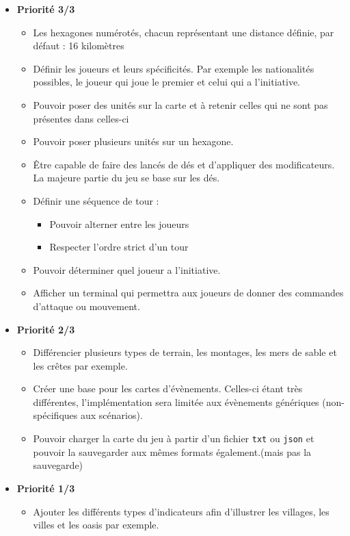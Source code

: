 \begin{itemize}
    \item \textbf{Priorité 3/3}
    \begin{itemize}
        \item Les hexagones numérotés, chacun représentant une distance définie, par défaut : 16 kilomètres \cmark
        \item Définir les joueurs et leurs spécificités. Par exemple les nationalités possibles, le joueur 
qui joue le premier et celui qui a l’initiative.\cmark
        \item Pouvoir poser des unités sur la carte et à retenir celles qui ne sont pas présentes dans
celles-ci \cmark
        \item Pouvoir poser plusieurs unités sur un hexagone.\cmark
        \item Être capable de faire des lancés de dés et d’appliquer des modificateurs. La majeure partie
du jeu se base sur les dés.\xmark
        \item Définir une séquence de tour :
        \begin{itemize}
            \item Pouvoir alterner entre les joueurs \cmark
            \item Respecter l’ordre strict d’un tour \cmark
        \end{itemize}
        \item Pouvoir déterminer quel joueur a l’initiative.
        \item Afficher un terminal qui permettra aux joueurs de donner des commandes d'attaque ou mouvement.\cmark
    \end{itemize}
    \item \textbf{Priorité 2/3}
    \begin{itemize}
        \item Différencier plusieurs types de terrain, les montages, les mers de sable et les crêtes
par exemple.\cmark
        \item Créer une base pour les cartes d’évènements. Celles-ci étant très différentes, l’implémentation sera limitée aux évènements génériques (non-spécifiques aux scénarios).\cmark
        \item Pouvoir charger la carte du jeu à partir d’un fichier \lstinline{txt} ou \lstinline{json} et pouvoir la sauvegarder
aux mêmes formats également.\cmark (mais pas la sauvegarde)
    \end{itemize}
    \item \textbf{Priorité 1/3}
    \begin{itemize}
        \item Ajouter les différents types d’indicateurs afin d’illustrer les villages, les villes et les
oasis par exemple. \cmark
    \end{itemize}
\end{itemize}

